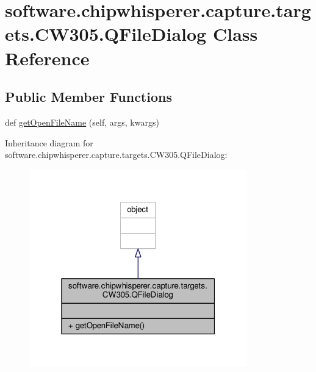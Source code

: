 \hypertarget{classsoftware_1_1chipwhisperer_1_1capture_1_1targets_1_1CW305_1_1QFileDialog}{}\section{software.\+chipwhisperer.\+capture.\+targets.\+C\+W305.\+Q\+File\+Dialog Class Reference}
\label{classsoftware_1_1chipwhisperer_1_1capture_1_1targets_1_1CW305_1_1QFileDialog}
\subsection*{Public Member Functions}
\begin{DoxyCompactItemize}
\item 
def \hyperlink{classsoftware_1_1chipwhisperer_1_1capture_1_1targets_1_1CW305_1_1QFileDialog_ad97ca2f44103ba62da20e2be102e6073}{get\+Open\+File\+Name} (self, args, kwargs)
\end{DoxyCompactItemize}


Inheritance diagram for software.\+chipwhisperer.\+capture.\+targets.\+C\+W305.\+Q\+File\+Dialog\+:\nopagebreak
\begin{figure}[H]
\begin{center}
\leavevmode
\includegraphics[width=268pt]{d6/d40/classsoftware_1_1chipwhisperer_1_1capture_1_1targets_1_1CW305_1_1QFileDialog__inherit__graph}
\end{center}
\end{figure}


